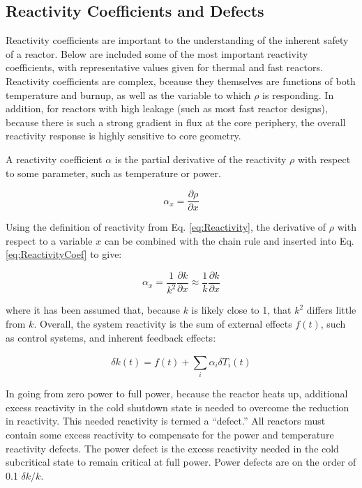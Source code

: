 \documentclass[10pt]{article}
\begin{document}
\begin{flushleft}
\section{Reactivity Coefficients and Defects}

Reactivity coefficients are important to the understanding of the inherent safety of a reactor. Below are included some of the most important reactivity coefficients, with representative values given for thermal and fast reactors. Reactivity coefficients are complex, bceause they themselves are functions of both temperature and burnup, as well as the variable to which \(\rho\) is responding. In addition, for reactors with high leakage (such as most fast reactor designs), because there is such a strong gradient in flux at the core periphery, the overall reactivity response is highly sensitive to core geometry.

A reactivity coefficient \(\alpha\) is the partial derivative of the reactivity \(\rho\) with respect to some parameter, such as temperature or power.

\begin{equation}
\label{eq:ReactivityCoef}
\alpha_x = \frac{\partial\rho}{\partial x}
\end{equation}

Using the definition of reactivity from Eq. \ref{eq:Reactivity}, the derivative of \(\rho\) with respect to a variable \(x\) can be combined with the chain rule and inserted into Eq. \ref{eq:ReactivityCoef} to give:

\begin{equation}
\label{eq:ReactivityCoef_kExpansion}
\alpha_x = \frac{1}{k^2}\frac{\partial k}{\partial x} \approx \frac{1}{k}\frac{\partial k}{\partial x}
\end{equation}

where it has been assumed that, because \(k\) is likely close to 1, that \(k^2\) differs little from \(k\). Overall, the system reactivity is the sum of external effects \(f(t)\), such as control systems, and inherent feedback effects:

\begin{equation}
\label{eq:OverallReactivity}
\delta k(t) = f(t) + \sum_{i}^{}\alpha_i\delta T_i(t)
\end{equation}

In going from zero power to full power, because the reactor heats up, additional excess reactivity in the cold shutdown state is needed to overcome the reduction in reactivity. This needed reactivity is termed a ``defect.'' All reactors must contain some excess reactivity to compensate for the power and temperature reactivity defects. The power defect is the excess reactivity needed in the cold subcritical state to remain critical at full power. Power defects are on the order of 0.1 \(\delta k/k\). 


\end{flushleft}
\end{document}
